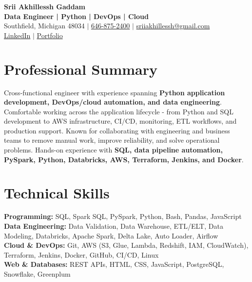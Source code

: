 \documentclass[letterpaper,10pt]{article}
\begin{document}
\fontsize{9.35pt}{10.45pt}\selectfont

\begin{center}
    {\LARGE \textbf{Srii Akhillessh Gaddam}} \\[-1pt]
    \textbf{Data Engineer | Python | DevOps | Cloud} \\[2pt]
    Southfield, Michigan 48034 $|$
    \href{tel:6468752400}{646-875-2400} $|$
    \href{mailto:sriiakhillessh@gmail.com}{sriiakhillessh@gmail.com} \\[1pt]
    \href{https://www.linkedin.com/in/srii-akhiilessh-gaddam-b48668191/}{LinkedIn} $|$
    \href{https://sriiakhillesshg.github.io/portfolio/}{Portfolio}
\end{center}
\vspace{-8pt}

\section{Professional Summary}
\small{Cross-functional engineer with experience spanning \textbf{Python application development, DevOps/cloud automation, and data engineering}. Comfortable working across the application lifecycle - from Python and SQL development to AWS infrastructure, CI/CD, monitoring, ETL workflows, and production support. Known for collaborating with engineering and business teams to remove manual work, improve reliability, and solve operational problems. Hands-on experience with \textbf{SQL, data pipeline automation, PySpark, Python, Databricks, AWS, Terraform, Jenkins, and Docker}.}

\section{Technical Skills}
\small{
\textbf{Programming:} SQL, Spark SQL, PySpark, Python, Bash, Pandas, JavaScript \\
\textbf{Data Engineering:} Data Validation, Data Warehouse, ETL/ELT, Data Modeling, Databricks, Apache Spark, Delta Lake, Auto Loader, Airflow \\
\textbf{Cloud \& DevOps:} Git, AWS (S3, Glue, Lambda, Redshift, IAM, CloudWatch), Terraform, Jenkins, Docker, GitHub, CI/CD, Linux \\
\textbf{Web \& Databases:} REST APIs, HTML, CSS, JavaScript, PostgreSQL, Snowflake, Greenplum
}
\end{document}
